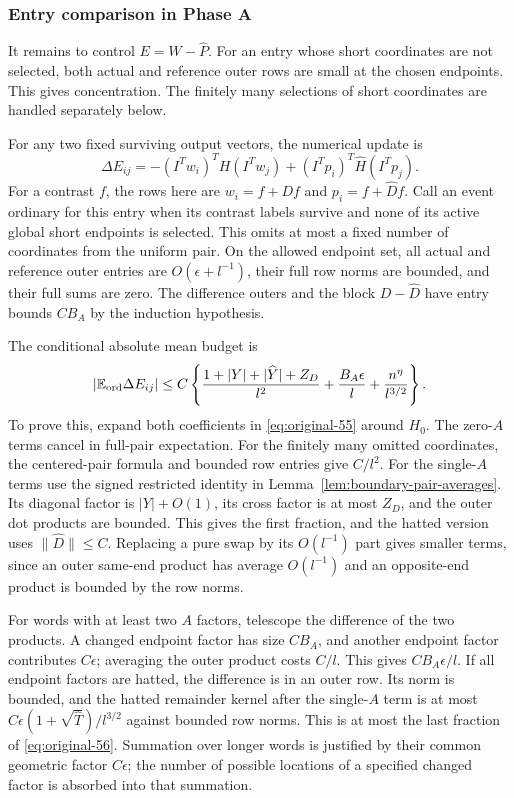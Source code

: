 \subsubsection*{Entry comparison in Phase A}
It remains to control $E=W-\widehat P$.  For an entry whose short
coordinates are not selected, both actual and reference outer rows are
small at the chosen endpoints.  This gives concentration.  The finitely
many selections of short coordinates are handled separately below.

For any two fixed surviving output vectors, the numerical update is
\begin{equation}
 \Delta E_{ij}
   =-(I^Tw_i)^TH(I^Tw_j)
         +(I^Tp_i)^T\widehat H(I^Tp_j).
 \label{eq:original-55}
\end{equation}
For a contrast $f$, the rows here are
$w_i=f+Df$ and $p_i=f+\widehat Df$.
Call an event ordinary for this entry when its contrast labels
survive and none of its active global short endpoints is selected.
This omits at most a fixed number of coordinates from the uniform
pair.  On the allowed endpoint set, all actual and reference outer
entries are $O(\epsilon+l^{-1})$, their full row norms are bounded,
and their full sums are zero.  The difference outers and the block
$D-\widehat D$ have entry bounds $CB_A$ by the induction hypothesis.

The conditional absolute mean budget is
\begin{equation}
 |\mathbb E_{\rm ord}\Delta E_{ij}|
 \le C\left\{
   \frac{1+|Y|+|\widehat Y|+Z_D}{l^2}
       +\frac{B_A\epsilon}{l}+\frac{n^\eta}{l^{3/2}}
       \right\}.
 \label{eq:original-56}
\end{equation}
To prove this, expand both coefficients in \eqref{eq:original-55}
around $H_0$.  The zero-$A$ terms cancel in full-pair expectation.
For the finitely many omitted coordinates, the centered-pair formula
and bounded row entries give $C/l^2$.
For the single-$A$ terms use the signed restricted identity in
Lemma~\ref{lem:boundary-pair-averages}.  Its diagonal factor is
$|Y|+O(1)$, its cross factor is at most $Z_D$, and the outer
dot products are bounded.  This gives the first fraction, and the
hatted version uses $\|\widehat D\|\le C$.
Replacing a pure swap by its $O(l^{-1})$ part gives smaller terms,
since an outer same-end product has average $O(l^{-1})$ and an
opposite-end product is bounded by the row norms.

For words with at least two $A$ factors, telescope the difference
of the two products.  A changed endpoint factor has size $CB_A$,
and another endpoint factor contributes $C\epsilon$; averaging
the outer product costs $C/l$.  This gives $CB_A\epsilon/l$.
If all endpoint factors are hatted, the difference is in an outer
row.  Its norm is bounded, and the hatted remainder kernel after
the single-$A$ term is at most
$C\epsilon(1+\sqrt{\widehat T})/l^{3/2}$ against bounded row
norms.  This is at most the last fraction of
\eqref{eq:original-56}.  Summation over longer words is justified
by their common geometric factor $C\epsilon$; the number of
possible locations of a specified changed factor is absorbed into
that summation.

